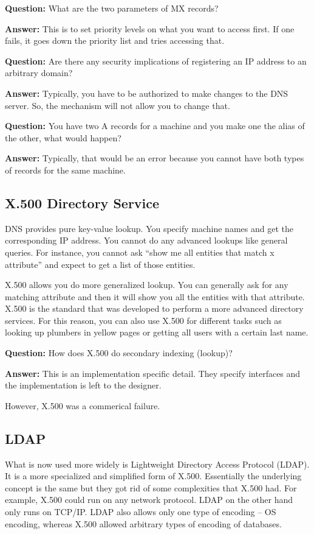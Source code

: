 \documentclass[twoside]{article}
\begin{document}
\textbf{Question: } What are the two parameters of MX records?

\textbf{Answer: } This is to set priority levels on what you want to access first. If one fails, it goes down the priority list and tries accessing that. 

\textbf{Question: } Are there any security implications of registering an IP address to an arbitrary domain? 

\textbf{Answer: } Typically, you have to be authorized to make changes to the DNS server. So, the mechanism will not allow you to change that.

\textbf{Question: } You have two A records for a machine and you make one the alias of the other, what would happen?

\textbf{Answer: } Typically, that would be an error because you cannot have both types of records for the same machine.

\subsection{X.500 Directory Service}
DNS provides pure key-value lookup. You specify machine names and get the corresponding IP address. You cannot do any advanced lookups like general queries. For instance, you cannot ask “show me all entities that match x attribute” and expect to get a list of those entities.

X.500 allows you do more generalized lookup. You can generally ask for any matching attribute and then it will show you all the entities with that attribute. X.500 is the standard that was developed to perform a more advanced directory services. For this reason, you can also use X.500 for different tasks such as looking up plumbers in yellow pages or getting all users with a certain last name.

\textbf{Question: } How does X.500 do secondary indexing (lookup)?

\textbf{Answer: } This is an implementation specific detail. They specify interfaces and the implementation is left to the designer.

However, X.500 was a commerical failure.

\subsection{LDAP}
What is now used more widely is Lightweight Directory Access Protocol (LDAP). It is a more specialized and simplified form of X.500. Essentially the underlying concept is the same but they got rid of some complexities that X.500 had. For example, X.500 could run on any network protocol. LDAP on the other hand only runs on TCP/IP. LDAP also allows only one type of encoding -- OS encoding, whereas X.500 allowed arbitrary types of encoding of databases.
\end{document}
